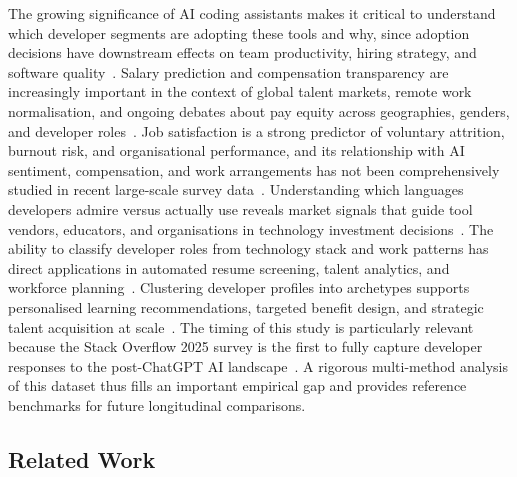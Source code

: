 \documentclass[journal, onecolumn]{IEEEtran}
\begin{document}
The growing significance of AI coding assistants makes it critical to understand which developer segments are adopting these tools and why, since adoption decisions have downstream effects on team productivity, hiring strategy, and software quality~\cite{dakhel2023github}.
Salary prediction and compensation transparency are increasingly important in the context of global talent markets, remote work normalisation, and ongoing debates about pay equity across geographies, genders, and developer roles~\cite{huang2022predicting}.
Job satisfaction is a strong predictor of voluntary attrition, burnout risk, and organisational performance, and its relationship with AI sentiment, compensation, and work arrangements has not been comprehensively studied in recent large-scale survey data~\cite{graziotin2022happiness}.
Understanding which languages developers admire versus actually use reveals market signals that guide tool vendors, educators, and organisations in technology investment decisions~\cite{storey2022disrupting}.
The ability to classify developer roles from technology stack and work patterns has direct applications in automated resume screening, talent analytics, and workforce planning~\cite{li2022developer}.
Clustering developer profiles into archetypes supports personalised learning recommendations, targeted benefit design, and strategic talent acquisition at scale~\cite{xu2022systematic}.
The timing of this study is particularly relevant because the Stack Overflow 2025 survey is the first to fully capture developer responses to the post-ChatGPT AI landscape~\cite{fan2023large}.
A rigorous multi-method analysis of this dataset thus fills an important empirical gap and provides reference benchmarks for future longitudinal comparisons.

\subsection{Related Work}
\end{document}
